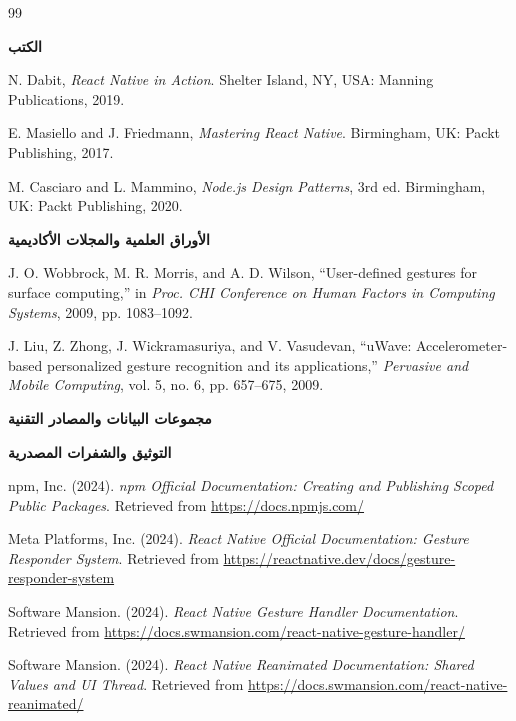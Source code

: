 \begin{thebibliography}{99}

\item[] \textbf{\large الكتب}

N. Dabit, \textit{React Native in Action}. Shelter Island, NY, USA: Manning Publications, 2019.

E. Masiello and J. Friedmann, \textit{Mastering React Native}. Birmingham, UK: Packt Publishing, 2017.

M. Casciaro and L. Mammino, \textit{Node.js Design Patterns}, 3rd ed. Birmingham, UK: Packt Publishing, 2020.

\item[] \textbf{\large الأوراق العلمية والمجلات الأكاديمية}

J. O. Wobbrock, M. R. Morris, and A. D. Wilson, ``User-defined gestures for surface computing,'' in \textit{Proc. CHI Conference on Human Factors in Computing Systems}, 2009, pp. 1083--1092.

J. Liu, Z. Zhong, J. Wickramasuriya, and V. Vasudevan, ``uWave: Accelerometer-based personalized gesture recognition and its applications,'' \textit{Pervasive and Mobile Computing}, vol. 5, no. 6, pp. 657--675, 2009.

\item[] \textbf{\large مجموعات البيانات والمصادر التقنية}

\item[] \textbf{\large التوثيق والشفرات المصدرية}

npm, Inc. (2024). \textit{npm Official Documentation: Creating and Publishing Scoped Public Packages}. Retrieved from \url{https://docs.npmjs.com/}

Meta Platforms, Inc. (2024). \textit{React Native Official Documentation: Gesture Responder System}. Retrieved from \url{https://reactnative.dev/docs/gesture-responder-system}

Software Mansion. (2024). \textit{React Native Gesture Handler Documentation}. Retrieved from \url{https://docs.swmansion.com/react-native-gesture-handler/}

Software Mansion. (2024). \textit{React Native Reanimated Documentation: Shared Values and UI Thread}. Retrieved from \url{https://docs.swmansion.com/react-native-reanimated/}

\end{thebibliography}
